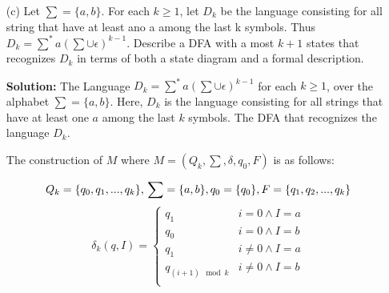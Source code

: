 \documentclass[9pt,tikz,border=2mm]{article}
\begin{document}
\begin{enumerate}
\begin{enumerate}
                \item[(c)]Let $\sum = \{a,b\}$. For each $k\geq1$, let $D_k$ be the language consisting for all string that have at least ano a among the last k symbols. Thus $D_k = \sum^*a(\sum\cup\epsilon)^{k-1}$. Describe a DFA with a most $k+1$ states that recognizes $D_k$ in terms of both a state diagram and a formal description.

                \textbf{Solution:}
                The Language $D_k=\sum^*a(\sum\cup\epsilon)^{k-1}$ for each $k\geq1$, over the alphabet $\sum=\{a,b\}$. Here, $D_k$ is the language consisting for all strings that have at least one $a$ among the last $k$ symbols. The DFA that recognizes the language $D_k$.

                The construction of $M$ where $M=(Q_k,\sum,\delta,q_0,F)$ is as follows:

                \[
                    Q_k=\{q_0,q_1,...,q_k\},\\
                    \sum=\{a,b\},\\
                    q_0=\{q_0\},\\
                    F=\{q_1,q_2,...,q_k\}\\
                \]
                \[\delta_k(q,I)=
                \begin{cases}
                    q_1 & i = 0 \wedge I=a\\
                    q_0 & i = 0 \wedge I=b\\
                    q_1 & i \neq 0 \wedge I=a\\
                    q_{(i+1)\mod k} & i \neq 0 \wedge I=b\\
                \end{cases}
                \]

                \newline
                

\end{enumerate}
\end{enumerate}
\end{document}
